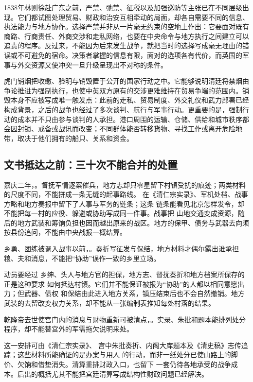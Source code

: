 1838年林则徐赴广东之前，严禁、弛禁、征税以及加强巡防等主张已在不同层级出现。它们都试图处理贸易、财政和治安互相牵动的局面，却各自需要不同的信息、执法能力与地方协作。选择严禁并非从一片毫无约束的空地上作出：它要面对既有商路、行商责任、外商交涉和走私网络，也要在中央命令与地方执行之间建立可以追责的程序。反过来，不能因为后来发生战争，就把当时的选择写成毫无理由的错误或不可避免的宿命。决策者掌握的信息有限，面对的选项各有代价，而英国的军事与外交资源又使冲突一旦升级呈现出不对称的条件。

虎门销烟把收缴、验明与销毁置于公开的国家行动之中。它能够说明清廷将禁烟由争论推进为强制执行，也使中英双方原有的交涉更难维持在贸易争端的范围内。销毁本身不应被写成唯一触发点：此前的走私、贸易制度、外交礼仪和武力部署已经构成背景，之后的战争也经过了多次谈判、航行与军事行动。更重要的是，强制行动的成本并不只由参与谈判的人承担。港口周围的运输、仓储、供给和城市秩序都会因封锁、戒备或战讯而改变；不同群体能否转移货物、寻找工作或离开危险地带，取决于他们拥有的船只、关系和资金。

\subsection{文书抵达之前：三十次不能合并的处置}

嘉庆二年，。督抚军情逐案催兵，地方志却只零星留下村镇受扰的痕迹；两类材料的尺度不同，不能拼成一条无缝的起事路线。
在《清仁宗实录》、军机处档、战事方略和地方奏报中留下了人事与军务的链条；这条
链条能看见北京怎样发令，却不能把每一村的应役、躲避或协助写成同一件事。战事把
山地交通变成资源，随后的地方武装和筹饷负担也因而越出原来的战区。地方的保甲、债务与武器去向须按县份追问，不能由中央战报一概结算。

乡勇、团练被调入战事以前，。奏折写征发与保结，地方材料才偶尔露出谁承担粮、夫和消息，不能把“协助”误作一致的乡里立场。

动员要经过
乡绅、头人与地方官的担保，地方志、督抚奏折和地方档案所保存的正是这种要求
如何抵达村镇。它们并不能保证被报为“协助”的人都以相同意愿出力；但武器、债权
和保结由此进入地方关系，镇压结束后也不会自然撤销。地方武装的去留改变权力关系，却不能从一张编制表推知每处村落的结果。

乾隆帝去世使宫门内的消息与财物重新可被清点，。实录、朱批和题本能排列处分程序，却不能替宫外的军需拖欠说明来处。

这一安排可由《清仁宗实录》、
宫中朱批奏折、内阁大库题本及《清史稿》志传追踪；这些材料所能确证的是办案与用人
的行动，而非一纸处分已使山路上的脚价、欠饷和借垫消失。清算重排财政入口，也留下
一套仍待各地承受的战争成本。后出的概括尤其不能把宫廷清算写成结构性财政问题已经解决。

